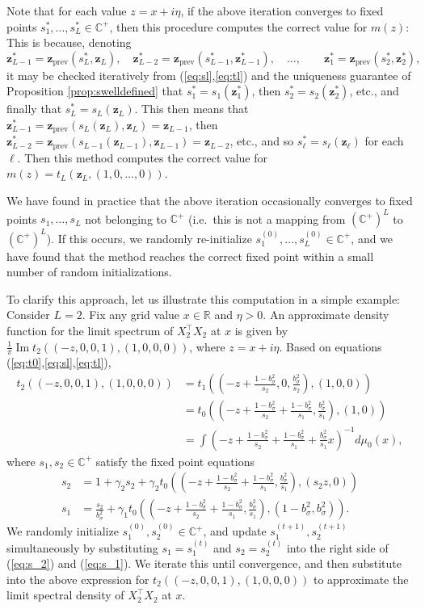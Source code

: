 \documentclass{article}
\theoremstyle{definition}
\newcommand{\R}{\mathbb{R}}
\newcommand{\C}{\mathbb{C}}
\newcommand{\prev}{{\text{prev}}}
\newcommand{\z}{\mathbf{z}}
\newcommand{\1}{\mathbf{1}}
\renewcommand{\Im}{\operatorname{Im}}
\begin{document}
Note that for each value $z=x+i\eta$, if the above iteration converges to fixed
points $s_1^*,\ldots,s_L^* \in \C^+$, then this procedure
computes the correct value for $m(z)$: This is because, denoting
\[\z_{L-1}^*=\z_\prev(s_L^*,\z_L), \quad
\z_{L-2}^*=\z_\prev(s_{L-1}^*,\z_{L-1}^*), \quad \ldots,
\qquad \z_1^*=\z_\prev(s_2^*,\z_2^*),\]
it may be checked iteratively from (\ref{eq:sl},\ref{eq:tl}) and the
uniqueness guarantee of Proposition \ref{prop:swelldefined} that
$s_1^*=s_1(\z_1^*)$, then $s_2^*=s_2(\z_2^*)$, etc., and finally that
$s_L^*=s_L(\z_L)$. This then means that
$\z_{L-1}^*=\z_\prev(s_L(\z_L),\z_L)=\z_{L-1}$, then
$\z_{L-2}^*=\z_\prev(s_{L-1}(\z_{L-1}),\z_{L-1})=\z_{L-2}$, etc.,
and so $s_\ell^*=s_\ell(\z_\ell)$ for each $\ell$. Then this 
method computes the correct value for $m(z)=t_L(\z_L,(1,0,\ldots,0))$.

We have found in practice that the above iteration occasionally converges to
fixed points $s_1,\ldots,s_L$ not belonging to $\C^+$ (i.e.\ this is not a
mapping from $(\C^+)^L$ to $(\C^+)^L$). If this occurs, we randomly
re-initialize $s_1^{(0)},\ldots,s_L^{(0)} \in \C^+$, and we have found that
the method reaches the correct fixed point within a small number of random
initializations.

To clarify this approach, let us illustrate this computation in a
simple example: Consider $L=2$. Fix any grid value $x\in\R$ and $\eta>0$. An
approximate density function for the limit spectrum of $X_2^\top X_2$ at $x$ is
given by $\frac{1}{\pi}\Im t_2\left((-z,0,0,1),(1,0,0,0) \right)$,
where $z=x+i\eta$. Based on equations (\ref{eq:t0},\ref{eq:sl},\ref{eq:tl}),
\begin{align*}
	t_2\left((-z,0,0,1),(1,0,0,0) \right)
	&= t_1\left(\left(-z+\frac{1-b_\sigma^2}{s_2},0,\frac{b_\sigma^2}{s_2}\right),(1,0,0) \right)\\
	&=
t_0\left(\left(-z+\frac{1-b_\sigma^2}{s_2}+\frac{1-b_\sigma^2}{s_1},\frac{b_\sigma^2}{s_1}\right),(1,0)
\right)\\
	&=\int
\left(-z+\frac{1-b_\sigma^2}{s_2}+\frac{1-b_\sigma^2}{s_1}+\frac{b_\sigma^2}{s_1}x\right)^{-1}d\mu_0(x),
\end{align*}
where $s_1,s_2\in\C^+$ satisfy the fixed point equations
\begin{align}
	s_2&=1+\gamma_2s_2+\gamma_2t_0\left(\left(-z+\frac{1-b_\sigma^2}{s_2}+\frac{1-b_\sigma^2}{s_1},\frac{b_\sigma^2}{s_1}\right),(s_2z,0)\right)\label{eq:s_2}\\
	s_1&=\frac{s_2}{b_\sigma^2}+\gamma_1t_0\left(\left(-z+\frac{1-b_\sigma^2}{s_2}+\frac{1-b_\sigma^2}{s_1},\frac{b_\sigma^2}{s_1}\right),(1-b_\sigma^2,b_\sigma^2) \right).\label{eq:s_1}
\end{align}
We randomly initialize $s_1^{(0)},s_2^{(0)}\in\C^+$, and
update $s_1^{(t+1)},s_2^{(t+1)}$ simultaneously by substituting
$s_1=s_1^{(t)}$ and $s_2=s_2^{(t)}$ into the right side of (\ref{eq:s_2}) and
(\ref{eq:s_1}). We iterate this until convergence, and
then substitute into the above expression for $t_2((-z,0,0,1),(1,0,0,0))$ to
approximate the limit spectral density of $X_2^\top X_2$ at $x$.
\end{document}
